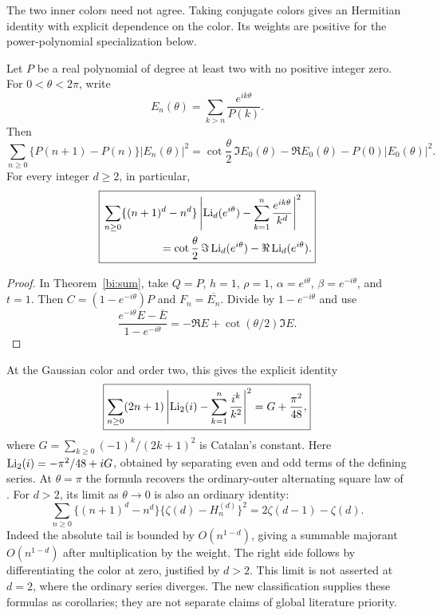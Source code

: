 The two inner colors need not agree. Taking conjugate colors gives an
Hermitian identity with explicit dependence on the color.  Its
weights are positive for the power-polynomial specialization below.

\begin{corollary}
\label{bi:hermitian}
Let $P$ be a real polynomial of degree at least two with no positive
integer zero. For $0<\theta<2\pi$, write
\[
 E_n(\theta)=\sum_{k>n}\frac{e^{ik\theta}}{P(k)}.
\]
Then
\begin{equation}\label{bi:hermitian-formula}
 \sum_{n\ge0}\{P(n+1)-P(n)\}|E_n(\theta)|^2
 =\cot\frac\theta2\,\Im E_0(\theta)-\Re E_0(\theta)
                         -P(0)|E_0(\theta)|^2.
\end{equation}
For every integer $d\ge2$, in particular,
\begin{equation}\label{bi:polylog-hermitian}
 \boxed{\begin{aligned}
 &\sum_{n\ge0}\{(n+1)^d-n^d\}
 \left|\Li_d(e^{i\theta})-\sum_{k=1}^n\frac{e^{ik\theta}}{k^d}\right|^2\\
 &\hspace{18mm}=\cot\frac\theta2\,\Im\Li_d(e^{i\theta})
                                  -\Re\Li_d(e^{i\theta}).
 \end{aligned}}
\end{equation}
\end{corollary}

\begin{proof}
In Theorem~\ref{bi:sum}, take $Q=P$, $h=1$, $\rho=1$,
$\alpha=e^{i\theta}$, $\beta=e^{-i\theta}$, and $t=1$.
Then $C=(1-e^{-i\theta})P$ and $F_n=\overline{E_n}$.
Divide by $1-e^{-i\theta}$ and use
\[
 \frac{e^{-i\theta}E-\overline E}{1-e^{-i\theta}}
       =-\Re E+\cot(\theta/2)\Im E.
\]
\end{proof}

At the Gaussian color and order two, this gives the explicit identity
\begin{equation}\label{bi:gaussian-example}
 \boxed{\displaystyle
 \sum_{n\ge0}(2n+1)
 \left|\operatorname{Li}_2(i)-\sum_{k=1}^n\frac{i^k}{k^2}\right|^2
          =G+\frac{\pi^2}{48},}
\end{equation}
where $G=\sum_{k\ge0}(-1)^k/(2k+1)^2$ is Catalan's constant.
Here $\operatorname{Li}_2(i)=-\pi^2/48+iG$, obtained by separating even and odd
terms of the defining series. At $\theta=\pi$ the formula recovers
the ordinary-outer alternating square law of \cite{tail-alternating}.
For $d>2$, its limit as $\theta\to0$ is also an ordinary identity:
\[
 \sum_{n\ge0}\{(n+1)^d-n^d\}
                 \{\zeta(d)-H_n^{(d)}\}^2
            =2\zeta(d-1)-\zeta(d).
\]
Indeed the absolute tail is bounded by $O(n^{1-d})$, giving a
summable majorant $O(n^{1-d})$ after multiplication by the weight.
The right side follows by differentiating the color at zero, justified
by $d>2$. This limit is not asserted at $d=2$, where the ordinary
series diverges. The new classification supplies these formulas as
corollaries; they are not separate claims of global literature priority.

